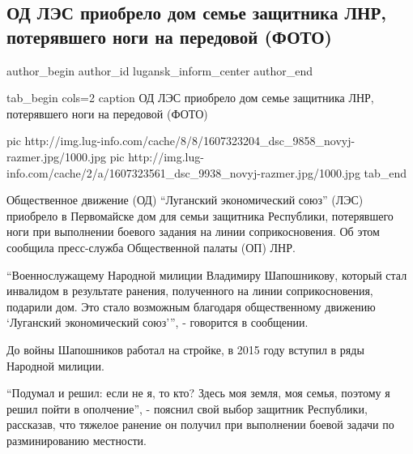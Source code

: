  
 
 
 
 
 
\subsection{ОД ЛЭС приобрело дом семье защитника ЛНР, потерявшего ноги на передовой (ФОТО)}
\label{sec:07_12_2020.news.lnr.lug_info.lugansk_inform_center.1.kvartira_voin}
\ifcmt
	author_begin
   author_id lugansk_inform_center
	author_end
\fi

\ifcmt
tab_begin cols=2
	caption ОД ЛЭС приобрело дом семье защитника ЛНР, потерявшего ноги на передовой (ФОТО)

	pic http://img.lug-info.com/cache/8/8/1607323204_dsc_9858_novyj-razmer.jpg/1000.jpg
	pic http://img.lug-info.com/cache/2/a/1607323561_dsc_9938_novyj-razmer.jpg/1000.jpg
tab_end
\fi

Общественное движение (ОД) \enquote{Луганский экономический союз} (ЛЭС) приобрело в
Первомайске дом для семьи защитника Республики, потерявшего ноги при выполнении
боевого задания на линии соприкосновения. Об этом сообщила пресс-служба
Общественной палаты (ОП) ЛНР.

\enquote{Военнослужащему Народной милиции Владимиру Шапошникову, который стал инвалидом
в результате ранения, полученного на линии соприкосновения, подарили дом. Это
стало возможным благодаря общественному движению \enquote{Луганский экономический
союз}}, - говорится в сообщении.

До войны Шапошников работал на стройке, в 2015 году вступил в ряды Народной милиции.

\enquote{Подумал и решил: если не я, то кто? Здесь моя земля, моя семья, поэтому я
решил пойти в ополчение}, - пояснил свой выбор защитник Республики, рассказав,
что тяжелое ранение он получил при выполнении боевой задачи по разминированию
местности.

